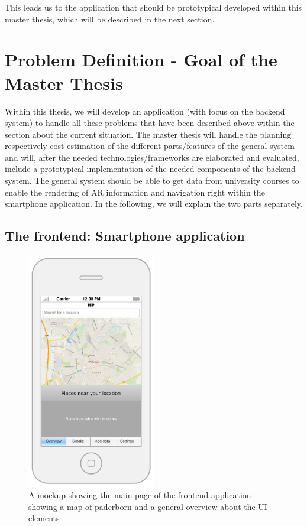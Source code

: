 \documentclass[a4page]{article}
\begin{document}
This leads us to the application that should be prototypical developed within this master thesis, which will be described in the next section. 
  
\section{Problem Definition - Goal of the Master Thesis} 
\label{ProblemDef}
Within this thesis, we will develop an application (with focus on the backend system) to handle all these problems that have been described above within the section about the current situation. The master thesis will handle the planning respectively cost estimation of the different parts/features of the general system and will, after the needed technologies/frameworks are elaborated and evaluated, include a prototypical implementation of the needed components of the backend system. The general system should be able to get data from university courses to enable the rendering of \ac{AR} information and navigation right within the smartphone application. In the following, we will explain the two parts separately.

\subsection{The frontend: Smartphone application} 
\begin{figure}[th]
\centerline{\includegraphics[width=0.5\textwidth]{gfx/mockup_app_1}}
\caption{A mockup showing the main page of the frontend application showing a map of paderborn and a general overview about the UI-elements}
\label{app1}
\end{figure}
\end{document}
